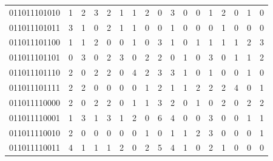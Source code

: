 \documentclass[10pt,a4paper]{article}
\begin{document}
\begin{longtable}{ |c|c|c|c|c|c|c|c|c|c|c|c|c|c|c|c|c| }
    011011101010              & 1                            & 2                                & 3                            & 2                              & 1   & 1   & 2   & 0   & 3   & 0   & 0   & 1   & 2   & 0   & 1   & 0   \\
    011011101011              & 3                            & 1                                & 0                            & 2                              & 1   & 1   & 0   & 0   & 1   & 0   & 0   & 0   & 1   & 0   & 0   & 0   \\
    011011101100              & 1                            & 1                                & 2                            & 0                              & 0   & 1   & 0   & 3   & 1   & 0   & 1   & 1   & 1   & 1   & 2   & 3   \\
    011011101101              & 0                            & 3                                & 0                            & 2                              & 3   & 0   & 2   & 2   & 0   & 1   & 0   & 3   & 0   & 1   & 1   & 2   \\
    011011101110              & 2                            & 0                                & 2                            & 2                              & 0   & 4   & 2   & 3   & 3   & 1   & 0   & 1   & 0   & 0   & 1   & 0   \\
    011011101111              & 2                            & 2                                & 0                            & 0                              & 0   & 0   & 1   & 2   & 1   & 1   & 2   & 2   & 2   & 4   & 0   & 1   \\
    011011110000              & 2                            & 0                                & 2                            & 2                              & 0   & 1   & 1   & 3   & 2   & 0   & 1   & 0   & 2   & 0   & 2   & 2   \\
    011011110001              & 1                            & 3                                & 1                            & 3                              & 1   & 2   & 0   & 6   & 4   & 0   & 0   & 3   & 0   & 0   & 1   & 1   \\
    011011110010              & 2                            & 0                                & 0                            & 0                              & 0   & 0   & 1   & 0   & 1   & 1   & 2   & 3   & 0   & 0   & 0   & 1   \\
    011011110011              & 4                            & 1                                & 1                            & 1                              & 2   & 0   & 2   & 5   & 4   & 1   & 0   & 2   & 1   & 0   & 0   & 0   \\

\end{longtable}
\end{document}
